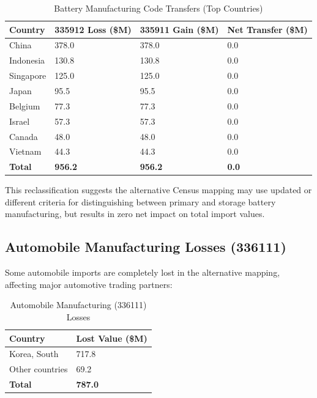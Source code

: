 \documentclass[11pt]{article}
\begin{document}
\begin{table}[H]
\centering
\caption{Battery Manufacturing Code Transfers (Top Countries)}
\begin{tabular}{lR{2cm}R{2cm}R{2cm}}
\toprule
\textbf{Country} & \textbf{335912 Loss (\$M)} & \textbf{335911 Gain (\$M)} & \textbf{Net Transfer (\$M)} \\
\midrule
China & 378.0 & 378.0 & 0.0 \\
Indonesia & 130.8 & 130.8 & 0.0 \\
Singapore & 125.0 & 125.0 & 0.0 \\
Japan & 95.5 & 95.5 & 0.0 \\
Belgium & 77.3 & 77.3 & 0.0 \\
Israel & 57.3 & 57.3 & 0.0 \\
Canada & 48.0 & 48.0 & 0.0 \\
Vietnam & 44.3 & 44.3 & 0.0 \\
\midrule
\textbf{Total} & \textbf{956.2} & \textbf{956.2} & \textbf{0.0} \\
\bottomrule
\end{tabular}
\label{tab:battery_reclassification}
\end{table}

This reclassification suggests the alternative Census mapping may use updated or different criteria for distinguishing between primary and storage battery manufacturing, but results in zero net impact on total import values.

\subsection{Automobile Manufacturing Losses (336111)}

Some automobile imports are completely lost in the alternative mapping, affecting major automotive trading partners:

\begin{table}[H]
\centering
\caption{Automobile Manufacturing (336111) Losses}
\begin{tabular}{lR{2.5cm}}
\toprule
\textbf{Country} & \textbf{Lost Value (\$M)} \\
\midrule
Korea, South & 717.8 \\
Other countries & 69.2 \\
\midrule
\textbf{Total} & \textbf{787.0} \\
\bottomrule
\end{tabular}
\label{tab:auto_losses}
\end{table}
\end{document}
